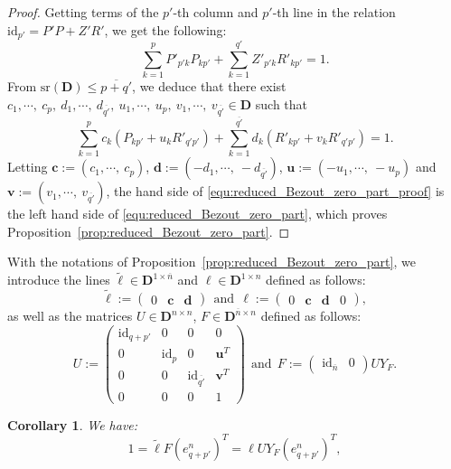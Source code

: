 \documentclass[10pt]{article}
\newtheorem{corollary}{Corollary}
\newcommand\g[1]{\textbf{#1}}
\newcommand\id[1]{\text{id}_{#1}}
\newcommand\sr[1]{\text{sr}\left(#1\right)}
\newcommand\D{\g{D}}
\begin{document}
\begin{proof}
  Getting terms of the $p'$-th column and $p'$-th line in the relation
  $\id{p'}=P'P+Z'R'$, we get the following:
  \[\sum_{k=1}^pP'_{p'k}P_{kp'}+\sum_{k=1}^{q'}Z'_{p'k}R'_{kp'}=1.\]
  From $\sr{\D}\leq\overline{p+q'}$, we deduce that there exist $c_1,
  \cdots,\ c_p,\ d_1,\cdots,\ d_{\overline{q'}},\ u_1,\cdots,\ u_p,\ v_1,
  \cdots,\ v_{\overline{q'}}\in\D$ such that
  \begin{equation}\label{equ:reduced_Bezout_zero_part_proof}
    \sum_{k=1}^pc_k\left(P_{kp'}+u_kR'_{q'p'}\right)+\sum_{k=1}^{
      \overline{q'}}d_k\left(R'_{kp'}+v_kR'_{q'p'}\right)=1.
  \end{equation}
  Letting $\g{c}:=\left(c_1,\cdots,\ c_p\right)$, $\g{d}:=\left(-d_1,
  \cdots,\ -d_{\overline{q'}}\right)$, $\g{u}:=\left(-u_1,\cdots,\ -u_p
  \right)$ and $\g{v}:=\left(v_1,\cdots,\ v_{\overline{q'}}\right)$, the
  hand side of \eqref{equ:reduced_Bezout_zero_part_proof} is the left
  hand side of \eqref{equ:reduced_Bezout_zero_part}, which proves
  Proposition~\ref{prop:reduced_Bezout_zero_part}.
\end{proof}

With the notations of Proposition~\ref{prop:reduced_Bezout_zero_part},
we introduce the lines $\tilde{\ell}\in\D^{1\times\overline{n}}$ and $
\ell\in\D^{1\times n}$ defined as follows:
\[\tilde{\ell}:=\begin{pmatrix}
0 & \g{c} & \g{d}\end{pmatrix}\ \ \text{and}\ \
\ell:=\begin{pmatrix}
0 & \g{c} & \g{d} & 0
\end{pmatrix},\]
as well as the matrices $U\in\D^{n\times n}$, $F\in\D^{\overline{n}\times
  n}$ defined as follows:
\[U:=\begin{pmatrix}
\id{q+p'} & 0 & 0 & 0\\
0 & \id{p} & 0 & \g{u}^T\\
0 & 0 & \id{\overline{q'}} & \g{v}^T\\
0 & 0 & 0 & 1
\end{pmatrix}\ \ \text{and}\ \
F:=\begin{pmatrix}
\id{\overline{n}} & 0
\end{pmatrix}UY_F.\]

\begin{corollary}\label{cor:extended_Bezout_zero_part}
  We have:
  \begin{equation}\label{equ:extend_Bezout_zero_part}
    1=\tilde{\ell}F(e^n_{q+p'})^T=\ell UY_F(e^n_{q+p'})^T,
  \end{equation}
\end{corollary}
\end{document}
